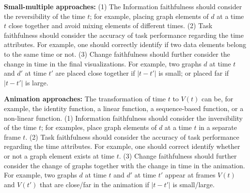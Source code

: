 \documentclass[10pt,journal,cspaper,compsoc]{IEEEtran}
\begin{document}
{\bf Small-multiple approaches:} (1) The Information faithfulness should consider the reversibility of the time $t$; for example, placing graph elements of $d$ at a time $t$ close together and avoid mixing elements of different times. (2) Task faithfulness should consider the accuracy of task performance regarding the time attributes. For example, one should correctly identify if two data elements belong to the same time or not. (3)
Change faithfulness should further consider the change in time in the final visualizations. For example, two graphs $d$ at time $t$ and $d'$ at time $t'$ are placed close together if $| t- t'|$ is small; or placed far if $| t -  t' |$ is large.

{\bf Animation approaches:} The transformation of time $t$ to $V(t)$ can be, for example, the identity function, a linear function, a sequence-based function, or a non-linear function. (1) Information faithfulness should consider the inversibility of the time $t$; for examples, place graph elements of $d$ at a time $t$ in a separate frame $t$. (2) Task faithfulness should consider the accuracy of task performance regarding the time attributes. For example, one should correct identify whether or not a graph element exists at time $t$. (3) Change faithfulness should further consider the change of graphs together with the change in time in the animation. For example, two graphs $d$ at time $t$ and $d'$ at time $t'$ appear at frames $V(t)$ and $V(t')$ that are close/far in the animation if $| t- t'|$ is small/large.
\end{document}
